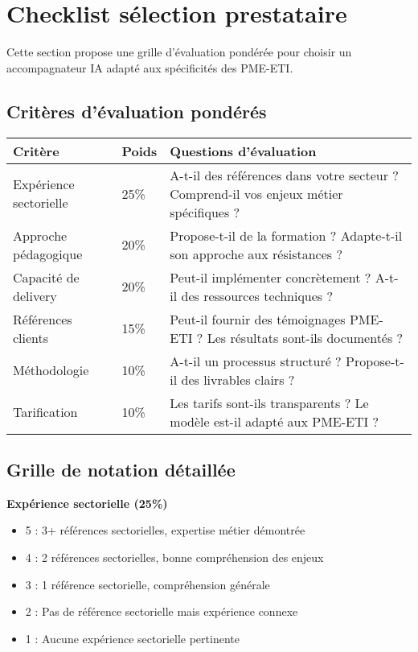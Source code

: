 \section{Checklist sélection prestataire}

Cette section propose une grille d'évaluation pondérée pour choisir un accompagnateur IA adapté aux spécificités des PME-ETI.

\subsection{Critères d'évaluation pondérés}

\begin{longtable}{@{}p{4cm}p{2cm}p{8cm}@{}}
\toprule
\textbf{Critère} & \textbf{Poids} & \textbf{Questions d'évaluation} \\
\midrule
Expérience sectorielle & 25\% & A-t-il des références dans votre secteur ? Comprend-il vos enjeux métier spécifiques ? \\
Approche pédagogique & 20\% & Propose-t-il de la formation ? Adapte-t-il son approche aux résistances ? \\
Capacité de delivery & 20\% & Peut-il implémenter concrètement ? A-t-il des ressources techniques ? \\
Références clients & 15\% & Peut-il fournir des témoignages PME-ETI ? Les résultats sont-ils documentés ? \\
Méthodologie & 10\% & A-t-il un processus structuré ? Propose-t-il des livrables clairs ? \\
Tarification & 10\% & Les tarifs sont-ils transparents ? Le modèle est-il adapté aux PME-ETI ? \\
\bottomrule
\end{longtable}

\subsection{Grille de notation détaillée}

\textbf{Expérience sectorielle (25\%)}
\begin{itemize}
    \item 5 : 3+ références sectorielles, expertise métier démontrée
    \item 4 : 2 références sectorielles, bonne compréhension des enjeux
    \item 3 : 1 référence sectorielle, compréhension générale
    \item 2 : Pas de référence sectorielle mais expérience connexe
    \item 1 : Aucune expérience sectorielle pertinente
\end{itemize}

